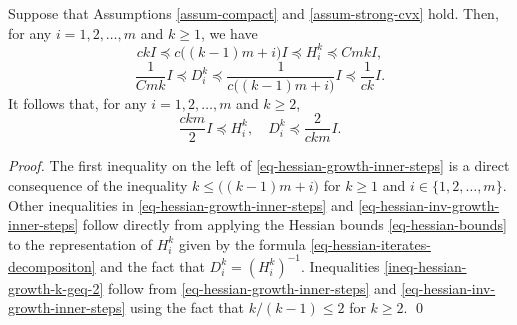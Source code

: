 \documentclass[final,numbook]{svjour3}
\begin{document}
\begin{lemma}\label{eq-iter-hess-bound} Suppose that Assumptions \ref{assum-compact} and \ref{assum-strong-cvx} hold. Then, for any $i = 1,2, \dots, m$ and $k\geq 1$, we have 
\begin{equation}\label{eq-hessian-growth-inner-steps} ck I \preceq c\big( (k-1)m + i\big) I \preceq   H_i^k \preceq Cmk I,  
\end{equation}
\begin{equation}\label{eq-hessian-inv-growth-inner-steps} \frac{1}{Cmk} I \preceq   D_i^k  \preceq \frac{1}{c\big( (k-1)m + i\big)} I \preceq \frac{1}{ck} I.
\end{equation}
It follows that, for any $i=1,2,\dots,m$ and $k\geq 2$,
  \begin{equation}\label{ineq-hessian-growth-k-geq-2}\frac{ckm}{2}I \preceq H_i^k, \quad D_i^k \preceq \frac{2}{ckm}I.
  \end{equation}  
\end{lemma}
\begin{proof}
The first inequality on the left of \eqref{eq-hessian-growth-inner-steps} is a direct consequence of the inequality $k \leq \big( (k-1)m + i\big)$ for $k\geq 1$ and $i \in \{1,2,\dots,m\}$. Other inequalities in \eqref{eq-hessian-growth-inner-steps} and \eqref{eq-hessian-inv-growth-inner-steps} follow directly from applying the Hessian bounds \eqref{eq-hessian-bounds} to the representation of $H_i^k$ given by the formula \eqref{eq-hessian-iterates-decompositon} and the fact that $D_i^k = (H_i^k)^{-1}$. Inequalities \eqref{ineq-hessian-growth-k-geq-2} follow from \eqref{eq-hessian-growth-inner-steps} and \eqref{eq-hessian-inv-growth-inner-steps} using the fact that $k/(k-1)\leq 2$ for $k\geq 2$.
\qed
\end{proof}
\end{document}
